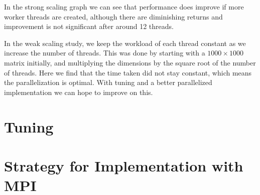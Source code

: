 \documentclass{article}
\begin{document}
In the strong scaling graph we can see that performance does improve if more worker threads are created, although there are diminishing returns and improvement is not significant after around 12 threads.

In the weak scaling study, we keep the workload of each thread constant as we increase the number of threads. This was done by starting with a $1000 \times 1000$ matrix initially, and multiplying the dimensions by the square root of the number of threads. Here we find that the time taken did not stay constant, which means the parallelization is optimal. With tuning and a better parallelized implementation we can hope to improve on this.

\section{Tuning}

\section{Strategy for Implementation with MPI}
\end{document}
